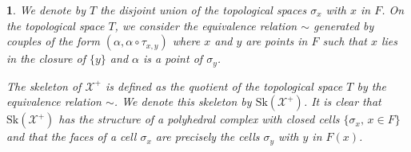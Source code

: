 \documentclass{amsart}%
\numberwithin{equation}{subsection}
\theoremstyle{plain2}
\theoremstyle{definition2}
\theoremstyle{stepstyle}
\theoremstyle{point}
\theoremstyle{subpoint}
\newtheorem{subpoint}[equation]{}%
\newcommand{\spa}[1]{\begin{subpoint}#1\end{subpoint}}           %
\newcommand{\cX}{\ensuremath{\mathscr{X}}}
\newcommand{\Sk}{\mathrm{Sk}}
\begin{document}
\spa{We denote by $T$ the disjoint union of the topological
spaces $\sigma_x$ with $x$ in $F$. On the topological space $T$, we consider the equivalence relation $\sim$ generated by couples of the form $(\alpha,\alpha\circ \tau_{x,y})$ where $x$ and $y$ are points in $F$ such that $x$ lies in the closure of $\{y\}$ and $\alpha$ is a point of $\sigma_y$.

The skeleton of $\cX^+$ is defined as the quotient of the topological space $T$ by the equivalence relation $\sim$. We denote this skeleton by $\Sk(\cX^+)$. It is clear that $\Sk(\cX^+)$ has the structure of a polyhedral complex with closed cells $\{\sigma_x,\,x\in F\}$ and that the faces of a cell $\sigma_x$ are precisely the cells $\sigma_y$ with $y$ in $F(x)$. 
 }
 
\end{document}
